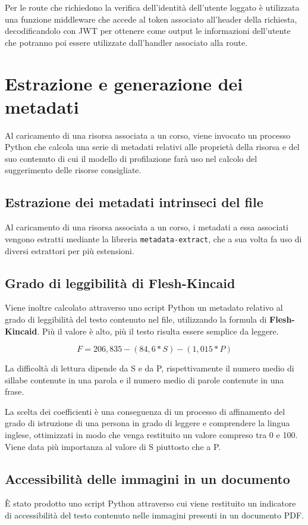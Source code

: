 Per le route che richiedono la verifica dell'identità dell'utente loggato è utilizzata una funzione middleware che accede al token associato all'header della richiesta, decodificandolo con JWT per ottenere come output le informazioni dell'utente che potranno poi essere utilizzate dall'handler associato alla route.

\section{Estrazione e generazione dei metadati}
Al caricamento di una risorsa associata a un corso, viene invocato un processo Python che calcola una serie di metadati relativi alle proprietà della risorsa e del suo contenuto di cui il modello di profilazione farà uso nel calcolo del suggerimento delle risorse consigliate.

\subsection{Estrazione dei metadati intrinseci del file}
Al caricamento di una risorsa associata a un corso, i metadati a essa associati vengono estratti mediante la libreria \texttt{metadata-extract}, che a sua volta fa uso di diversi estrattori per più estensioni.

\subsection{Grado di leggibilità di Flesh-Kincaid}
Viene inoltre calcolato attraverso uno script Python un metadato relativo al grado di leggibilità del testo contenuto nel file, utilizzando la formula di \textbf{Flesh-Kincaid}. Più il valore è alto, più il testo risulta essere semplice da leggere.

\[ F=206,835-(84,6*S)-(1,015*P) \]

La difficoltà di lettura dipende da S e da P, rispettivamente il numero medio di sillabe contenute in una parola e il numero medio di parole contenute in una frase.

La scelta dei coefficienti è una conseguenza di un processo di affinamento del grado di istruzione di una persona in grado di leggere e comprendere la lingua inglese, ottimizzati in modo che venga restituito un valore compreso tra 0 e 100. Viene data più importanza al valore di S piuttosto che a P.\cite{readibility}

\subsection{Accessibilità delle immagini in un documento}
È stato prodotto uno script Python attraverso cui viene restituito un indicatore di accessibilità del testo contenuto nelle immagini presenti in un documento PDF.

